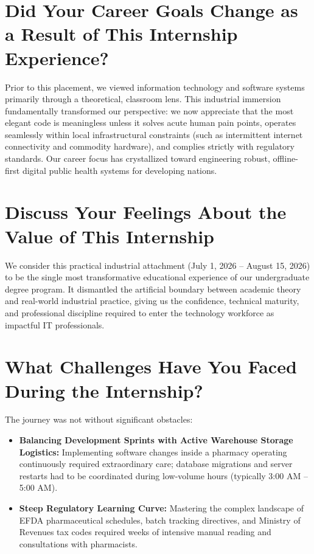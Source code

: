 \section{Did Your Career Goals Change as a Result of This Internship Experience?}
Prior to this placement, we viewed information technology and software systems primarily through a theoretical, classroom lens. This industrial immersion fundamentally transformed our perspective: we now appreciate that the most elegant code is meaningless unless it solves acute human pain points, operates seamlessly within local infrastructural constraints (such as intermittent internet connectivity and commodity hardware), and complies strictly with regulatory standards. Our career focus has crystallized toward engineering robust, offline-first digital public health systems for developing nations.

\section{Discuss Your Feelings About the Value of This Internship}
We consider this practical industrial attachment (July 1, 2026 -- August 15, 2026) to be the single most transformative educational experience of our undergraduate degree program. It dismantled the artificial boundary between academic theory and real-world industrial practice, giving us the confidence, technical maturity, and professional discipline required to enter the technology workforce as impactful IT professionals.

\section{What Challenges Have You Faced During the Internship?}
The journey was not without significant obstacles:
\begin{itemize}
    \item \textbf{Balancing Development Sprints with Active Warehouse Storage Logistics:} Implementing software changes inside a pharmacy operating continuously required extraordinary care; database migrations and server restarts had to be coordinated during low-volume hours (typically 3:00 AM -- 5:00 AM).
    \item \textbf{Steep Regulatory Learning Curve:} Mastering the complex landscape of EFDA pharmaceutical schedules, batch tracking directives, and Ministry of Revenues tax codes required weeks of intensive manual reading and consultations with pharmacists.
\end{itemize}

